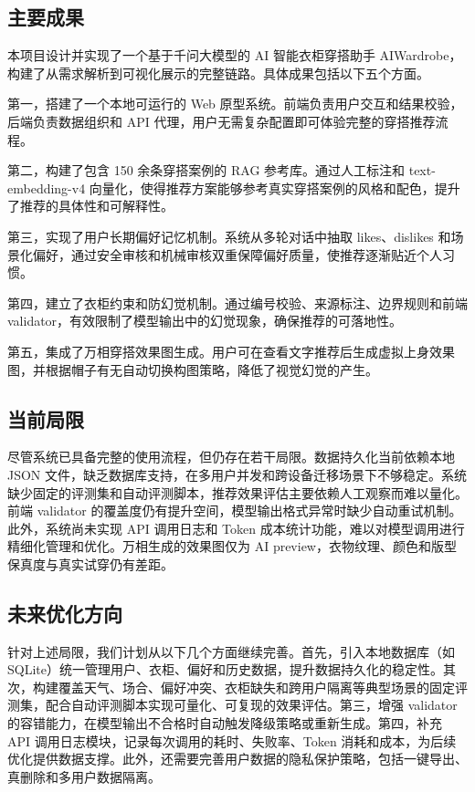 \documentclass{applemlr}
\begin{document}
\subsection{主要成果}

本项目设计并实现了一个基于千问大模型的 AI 智能衣柜穿搭助手 AIWardrobe，构建了从需求解析到可视化展示的完整链路。具体成果包括以下五个方面。

第一，搭建了一个本地可运行的 Web 原型系统。前端负责用户交互和结果校验，后端负责数据组织和 API 代理，用户无需复杂配置即可体验完整的穿搭推荐流程。

第二，构建了包含 150 余条穿搭案例的 RAG 参考库。通过人工标注和 text-embedding-v4 向量化，使得推荐方案能够参考真实穿搭案例的风格和配色，提升了推荐的具体性和可解释性。

第三，实现了用户长期偏好记忆机制。系统从多轮对话中抽取 likes、dislikes 和场景化偏好，通过安全审核和机械审核双重保障偏好质量，使推荐逐渐贴近个人习惯。

第四，建立了衣柜约束和防幻觉机制。通过编号校验、来源标注、边界规则和前端 validator，有效限制了模型输出中的幻觉现象，确保推荐的可落地性。

第五，集成了万相穿搭效果图生成。用户可在查看文字推荐后生成虚拟上身效果图，并根据帽子有无自动切换构图策略，降低了视觉幻觉的产生。

\subsection{当前局限}

尽管系统已具备完整的使用流程，但仍存在若干局限。数据持久化当前依赖本地 JSON 文件，缺乏数据库支持，在多用户并发和跨设备迁移场景下不够稳定。系统缺少固定的评测集和自动评测脚本，推荐效果评估主要依赖人工观察而难以量化。前端 validator 的覆盖度仍有提升空间，模型输出格式异常时缺少自动重试机制。此外，系统尚未实现 API 调用日志和 Token 成本统计功能，难以对模型调用进行精细化管理和优化。万相生成的效果图仅为 AI preview，衣物纹理、颜色和版型保真度与真实试穿仍有差距。

\subsection{未来优化方向}

针对上述局限，我们计划从以下几个方面继续完善。首先，引入本地数据库（如 SQLite）统一管理用户、衣柜、偏好和历史数据，提升数据持久化的稳定性。其次，构建覆盖天气、场合、偏好冲突、衣柜缺失和跨用户隔离等典型场景的固定评测集，配合自动评测脚本实现可量化、可复现的效果评估。第三，增强 validator 的容错能力，在模型输出不合格时自动触发降级策略或重新生成。第四，补充 API 调用日志模块，记录每次调用的耗时、失败率、Token 消耗和成本，为后续优化提供数据支撑。此外，还需要完善用户数据的隐私保护策略，包括一键导出、真删除和多用户数据隔离。
\end{document}

